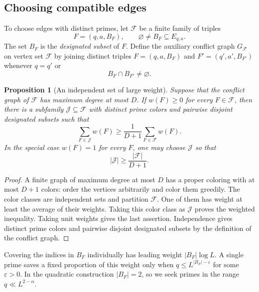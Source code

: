 \documentclass[11pt]{amsart}
\newtheorem{proposition}[theorem]{Proposition}
\theoremstyle{definition}
\theoremstyle{remark}
\begin{document}
\subsection{Choosing compatible edges}
To choose edges with distinct primes, let $\mathcal F$ be a finite family
of triples
\[
F=(q,a,B_F),
\qquad
\varnothing\neq B_F\subseteq E_{q,a}.
\]
The set $B_F$ is the \emph{designated subset} of $F$.  Define the auxiliary
conflict graph $G_{\mathcal F}$ on vertex set $\mathcal F$ by joining
distinct triples $F=(q,a,B_F)$ and $F'=(q',a',B_{F'})$ whenever $q=q'$ or
\[
B_F\cap B_{F'}\neq\varnothing.
\]

\begin{proposition}[An independent set of large weight]
\label{prop:conflict-selection}
Suppose that the conflict graph of $\mathcal F$ has maximum degree at most
$D$.  If $w(F)\geq0$ for every $F\in\mathcal F$, then there is a subfamily
$\mathcal J\subseteq\mathcal F$ with distinct prime colors and pairwise
disjoint designated subsets such that
\[
\sum_{F\in\mathcal J}w(F)
\geq\frac1{D+1}\sum_{F\in\mathcal F}w(F).
\]
In the special case $w(F)=1$ for every $F$, one may choose $\mathcal J$ so
that
\[
|\mathcal J|\geq\frac{|\mathcal F|}{D+1}.
\]
\end{proposition}

\begin{proof}
A finite graph of maximum degree at most $D$ has a proper coloring with at
most $D+1$ colors: order the vertices arbitrarily and color them greedily.
The color classes are independent sets and partition $\mathcal F$.  One of
them has weight at least the average of their weights.  Taking this color
class as $\mathcal J$ proves the weighted inequality.  Taking unit weights
gives the last assertion.  Independence gives distinct prime colors and
pairwise disjoint designated subsets by the definition of the conflict graph.
\end{proof}

Covering the indices in $B_F$ individually has leading weight
$|B_F|\log L$. A single prime saves a fixed proportion of this weight
only when $q\leq L^{|B_F|-\varepsilon}$ for some $\varepsilon>0$.
In the quadratic construction $|B_F|=2$, so we seek primes in the range
$q\ll L^{2-\alpha}$.
\end{document}
